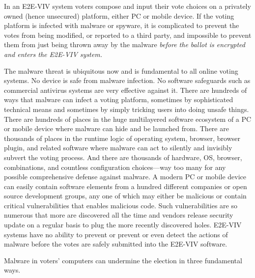 In an E2E-VIV system voters compose and input their vote choices on a
privately owned (hence unsecured) platform, either PC or mobile
device. If the voting platform is infected with malware or spyware, it
is complicated to prevent the votes from being modified, or reported
to a third party, and impossible to prevent them from just being
thrown away by the malware \emph{before the ballot is encrypted and
  enters the E2E-VIV system.}

The malware threat is ubiquitous now and is fundamental to all online
voting systems. No device is safe from malware infection. No software
safeguards such as commercial antivirus systems are very effective
against it. There are hundreds of ways that malware can infect a
voting platform, sometimes by sophisticated technical means and
sometimes by simply tricking users into doing unsafe things. There are
hundreds of places in the huge multilayered software ecosystem of a PC
or mobile device where malware can hide and be launched from. There
are thousands of places in the runtime logic of operating system,
browser, browser plugin, and related software where malware can act to
silently and invisibly subvert the voting process. And there are
thousands of hardware, OS, browser, combinations, and countless
configuration choices---way too many for any possible comprehensive
defense against malware. A modern PC or mobile device can easily
contain software elements from a hundred different companies or open
source development groups, any one of which may either be malicious or
contain critical vulnerabilities that enables malicious code. Such
vulnerabilities are so numerous that more are discovered all the time
and vendors release security update on a regular basis to plug the
more recently discovered holes. E2E-VIV systems have no ability to
prevent or prevent or even detect the actions of malware before the
votes are safely submitted into the E2E-VIV software.

Malware in voters' computers can undermine the election in three
fundamental ways. 


